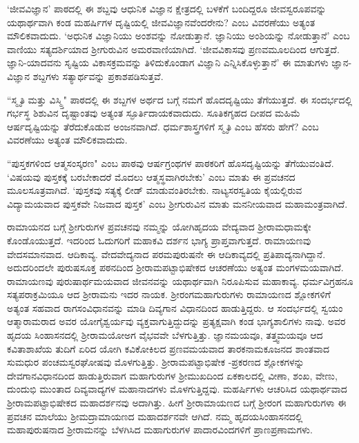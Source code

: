 `ಜೀವವಿಜ್ಞಾನ' ಪಾಠದಲ್ಲಿ ಈ ಶಬ್ದವು ಆಧುನಿಕ ವಿಜ್ಞಾನ ಕ್ಷೇತ್ರದಲ್ಲಿ ಬಳಕೆಗೆ ಬಂದಿದ್ದರೂ ಜೀವಸ್ವರೂಪವನ್ನು ಯಥಾರ್ಥವಾಗಿ ಕಂಡ ಮಹರ್ಷಿಗಳ ದೃಷ್ಟಿಯಲ್ಲಿ ಜೀವವಿಜ್ಞಾನವೆಂದರೇನು? ಎಂಬ ವಿವರಣೆಯು ಅತ್ಯಂತ ಮೌಲಿಕವಾದುದು. `ಅಧುನಿಕ ವಿಜ್ಞಾನಿಯು ಅಂಶವನ್ನು ನೋಡುತ್ತಾನೆ. ಜ್ಞಾನಿಯು ಅಂಶಿಯನ್ನು  ನೋಡುತ್ತಾನೆ' ಎಂಬ ವಾಣಿಯು ಸತ್ಯದರ್ಶಿಯಾದ ಶ್ರೀಗುರುವಿನ ಅಮರವಾಣಿಯಾಗಿದೆ. `ಜೀವವಿಕಾಸವು ಪ್ರಣವಮೂಲದಿಂದ ಆಗುತ್ತದೆ. ಜ್ಞಾನಿ-ಯಾದವನು ಸೃಷ್ಟಿಯ ವಿಕಾಸಕ್ರಮವನ್ನು ತಿಳಿದುಕೊಂಡಾಗ ವಿಜ್ಞಾನಿ ಎನ್ನಿಸಿಕೊಳ್ಳುತ್ತಾನೆ' ಈ ಮಾತುಗಳು ಜ್ಞಾನ-ವಿಜ್ಞಾನ ಶಬ್ದಗಳು ಸತ್ಯಾರ್ಥವನ್ನು ಪ್ರಕಾಶಪಡಿಸುತ್ತವೆ.

``ಸ್ಮೃತಿ ಮತ್ತು ವಿಸ್ಮ್ತಿ" ಪಾಠದಲ್ಲಿ ಈ ಶಬ್ದಗಳ ಅರ್ಥದ ಬಗ್ಗೆ  ನಮಗೆ ಹೊದದೃಷ್ಟಿಯು ತೆಗೆಯುತ್ತದೆ. ಈ ಸಂದರ್ಭದಲ್ಲಿ ಗರ್ಭಸ್ಥ ಶಿಶುವಿನ ದೃಷ್ಟಾಂತವು ಅತ್ಯಂತ  ಸ್ಫೂರ್ತಿದಾಯಕವಾದುದು. ಸೂತಿಕಗೃಹದ ದೀಪದ ಮಹಿಮೆ ಆರ್ಷದೃಷ್ಟಿಯನ್ನು ತೆರೆದುಕೊಡುವ ಅಂಜನವಾಗಿದೆ. ಧರ್ಮಶಾಸ್ತ್ರಗಳಿಗೆ ಸ್ಮೃತಿ ಎಂಬ ಹೆಸರು ಹೇಗೆ? ಎಂಬ ವಿವರಣೆಯು ಅತ್ಯಂತ ಮೌಲಿಕವಾದುದು.

``ಪುಸ್ತಕಗಳಿಂದ ಆತ್ಮಸಂಸ್ಕರಣ" ಎಂಬ ಪಾಠವು ಆರ್ಷಗ್ರಂಥಗಳ ಪಾಠಕರಿಗೆ ಹೊಸದೃಷ್ಟಿಯನ್ನು ತೆಗೆಯುವಂತಿದೆ. `ವಿಷಯವು ಪುಸ್ತಕಕ್ಕೆ  ಬರಬೇಕಾದರೆ ಮೊದಲು ಆತ್ಮಸ್ಥವಾಗಿರಬೇಕು' ಎಂಬ ಮಾತು ಈ ಪ್ರವಚನದ ಮೂಲಸೂತ್ರವಾಗಿದೆ. `ಪುಸ್ತಕವು ಸತ್ಯಕ್ಕೆ ಲೀಡ್ ಮಾಡುವಂತಿರಬೇಕು. ನಾಟ್ಯಸರಸ್ವತಿಯ ಕೈಯಲ್ಲಿರುವ ವಿದ್ಯಾಮಯವಾದ ಪುಸ್ತಕವೇ ನಿಜವಾದ ಪುಸ್ತಕ' ಎಂಬ ಶ್ರೀಗುರುವಿನ ಮಾತು ಮನನೀಯವಾದ ಮಹಾಮಂತ್ರವಾಗಿದೆ.

ರಾಮಾಯನದ ಬಗ್ಗೆ  ಶ್ರೀಗುರುಗಳ ಪ್ರವಚನವು ನಮ್ಮನ್ನು ಯೋಗಿಹೃದಯ ವೇದ್ಯವಾದ ಶ್ರೀರಾಮಧಾಮಕ್ಕೇ ಕೊಂಡೊಯುತ್ತದೆ. ಇದರಿಂದ ಓದುಗರಿಗೆ ಮಹಾಕವಿ ದರ್ಶನ ಭಾಗ್ಯ ಪ್ರಾಪ್ತವಾಗುತ್ತದೆ. ರಾಮಾಯಣವು ವೇದಸಮಾನವಾದ. ಆದಿಕಾವ್ಯ. ವೇದವೇದ್ಯನಾದ ಪರಮಪುರುಷನೇ ಈ ಆದಿಕಾವ್ಯದಲ್ಲಿ ಪ್ರತಿಪಾದ್ಯನಾಗಿದ್ದಾನೆ. ಅದುದರಿಂದಲೇ ಪುರುಷಸೂಕ್ತ  ಪಠನದಿಂದ ಶ್ರೀರಾಮಪಟ್ಟಾಭಿಷೇಕದ ಆಚರಣೆಯು ಅತ್ಯಂತ ಮಂಗಳಮಯವಾಗಿದೆ. ರಾಮಾಯಣವು ಪುರುಷಾರ್ಥಮಯವಾದ ಜೀವನವನ್ನು ಯಥಾರ್ಥವಾಗಿ ನಿರೂಪಿಸುವ ಮಹಾಕಾವ್ಯ. ಧರ್ಮವಿಗ್ರಹನೂ ಸತ್ಯಪರಾಕ್ರಮಿಯೂ ಆದ ಶ್ರೀರಾಮನು ಇದರ ನಾಯಕ. ಶ್ರೀರಂಗಮಹಾಗುರುಗಳು ರಾಮಾಯಣದ ಶ್ಲೋಕಗಳಿಗೆ ಅತ್ಯಂತ ಸಹವಾದ ರಾಗಸಂವಿಧಾನವನ್ನು ಮಾಡಿ ದಿವ್ಯಗಾನ ವಿಧಾನದಿಂದ ಹಾಡುತ್ತಿದ್ದರು. ಆ ಸಂದರ್ಭದಲ್ಲಿ ಸ್ವಯಂ ಆತ್ಮಾರಾಮರಾದ ಅವರ ಯೋಗೈಶ್ವರ್ಯವು ವ್ಯಕ್ತವಾಗುತ್ತಿದ್ದುದನ್ನು ಪ್ರತ್ಯಕ್ಷವಾಗಿ ಕಂಡ ಭಾಗ್ಯಶಾಲಿಗಳು ನಾವು. ಅವರ ಹೃದಯ ಸಿಂಹಾಸನದಲ್ಲಿ ಶ್ರೀರಾಮಯೋಅಗ ವೈಭವವೇ ಬೆಳಗುತ್ತಿತ್ತು. ಜ್ಞಾನಮಯವೂ, ತತ್ತ್ವಮಯವೂ ಆದ ಕವಿತಾಶಾಖೆಯ ತುದಿಗೆ ಏರಿದ ಯೋಗಿ ಕವಿಕೋಕಿಲದ ಪ್ರಣವಮಯವಾದ ತಾರಕನಾಮಕೂಜನದ ಶಾಂತವಾದ ಸುಮಧುರ ಪಂಚಮಸ್ವರಘೋಷವು ಮೊಳಗುತ್ತಿತ್ತು. ಶ್ರೀರಾಮಪಟ್ಟಾಭಿಷೇಕ -ಪ್ರಕರಣದ ಶ್ಲೋಕಗಳನ್ನು ದೇವಗಾನವಿಧಾನದಿಂದ ಹಾಡುತ್ತಿರುವಾಗ ಮಹಾಗುರುಗಳ ಶ್ರೀಮುಖದಿಂದ ಏಕಕಾಲದಲ್ಲಿ ವೀಣಾ, ಶಂಖ, ವೇಣು, ದುಂದುಭಿ ಮುಂತಾದ ದಿವ್ಯವಾದ್ಯಗಳ ಮಹಾನಾದಗಳು ಮೊಳಗುತ್ತಿದ್ದವು. ಮಹರ್ಷಿಗಳು ಆಚರಿಸಿದ ಯಥಾರ್ಥವಾದ ಶ್ರೀರಾಮಪಟ್ಟಾಭಿಷೇಕದ ಮಹಾದರ್ಶನವು ಅದಾಗಿತ್ತು. ಹೀಗೆ ಶ್ರೀರಾಮಾಯಣದ ಬಗ್ಗೆ ಶ್ರೀರಂಗ ಮಹಾಗುರುಗಳಾ ಈ ಪ್ರವಚನ ಮಾಲೆಯು ಶ್ರೀಮದ್ರಾಮಾಯಣದ ಮಹಾದರ್ಶನವೇ ಆಗಿದೆ. ನಮ್ಮ ಹೃದಯಸಿಂಹಾಸನದಲ್ಲಿ ಮಹಾಪುರುಷನಾದ ಶ್ರೀರಾಮನನ್ನು ಬೆಳಗಿಸಿದ ಮಹಾಗುರುಗಳ ಪಾದಾರವಿಂದಗಳಿಗೆ ಪ್ರಾಣಪ್ರಣಾಮಗಳು.

